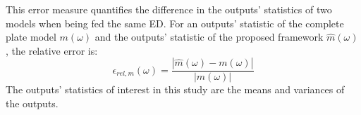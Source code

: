 This error measure quantifies the difference in the outputs' statistics of two models when being fed the same ED.
For an outputs' statistic of the complete plate model $m\left(\omega\right)$ and the outputs' statistic of the proposed framework $\widehat{m}\left(\omega\right)$, the relative error is:
\begin{equation}
    \epsilon_{rel, m} \left(\omega\right)
    =
    \frac{
        \left|
            \widehat{m}\left(\omega\right)
            -
            m\left(\omega\right)
        \right|
    }{
        \left|
            m\left(\omega\right)
        \right|
    }
\end{equation}
The outputs' statistics of interest in this study are the means and variances of the outputs.